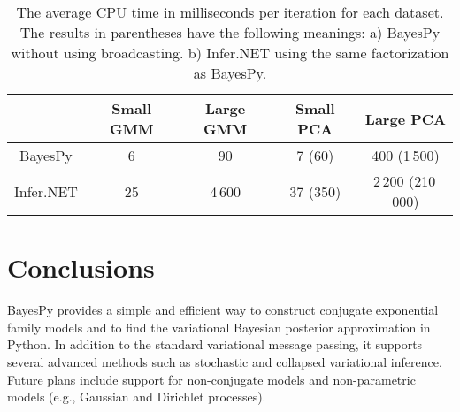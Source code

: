 \documentclass[twoside,11pt]{article}
\begin{document}
\begin{table}[tb]
  \centering
  \caption{
    The average CPU time in milliseconds per iteration for each
    dataset.  The results in parentheses have the following meanings: a) BayesPy without using
    broadcasting. b) Infer.NET using the same factorization as
    BayesPy.
  }
  \small
  \begin{tabular}{ccccc}
    &
    Small GMM
    &
    Large GMM
    &
    Small PCA
    &
    Large PCA
    \\
    \hline
    BayesPy     & 6 & 90  & 7 (60) & 400 (1\,500)
    \\
    Infer.NET   & 25 & 4\,600 & 37 (350) & 2\,200 (210\,000)
  \end{tabular}
  \label{tab:speed}
\end{table}


\section{Conclusions}

BayesPy provides a simple and efficient way to construct conjugate exponential
family models and to find the variational Bayesian posterior approximation in
Python.
%
In addition to the standard variational message passing, it supports several
advanced methods such as stochastic and collapsed variational inference.  Future
plans include support for non-conjugate models and non-parametric models (e.g.,
Gaussian and Dirichlet processes).







\vskip 0.2in
\small

\end{document}
